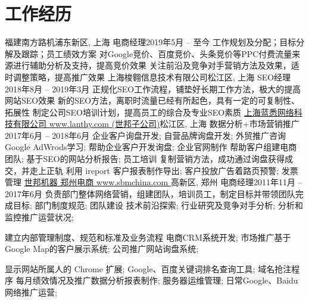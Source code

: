 \section{\textbf{工作经历}}
  \resumeSubHeadingListStart
    \resumeSubheading
      {福建南方路机}{浦东新区, 上海}
      {电商经理}{2019年5月 -- 至今}
      \resumeItemListStart
          {工作规划及分配；目标分解及跟踪；员工绩效方案}
          {对Google竞价、百度竞价、头条竞价等PPC付费流量来源进行辅助分析及支持，提高竞价效果}
          {关注前沿及竞争对手营销方法及效果，适时调整策略，提高推广效果}
      \resumeItemListEnd
    \resumeSubheading
      {上海梭翱信息技术有限公司}{松江区, 上海}
      {SEO经理}{2018年8月 -- 2019年3月}
      \resumeItemListStart
          {正规化SEO工作流程，铺垫好长期工作方法，极大的提高网站SEO效果}
          {新的SEO方法，离职时流量已经有所起色，具有一定的可复制性、拓展性}
          {制定公司SEO培训计划，提高员工的综合及专业SEO素质}
      \resumeItemListEnd
    \resumeSubheading
      {\href{http://www.lanthy.com/}{上海蓝悉网络科技有限公司 www.lanthy.com (世邦子公司)}}{松江区, 上海}
      {数据分析+市场营销推广}{2017年6月 -- 2018年6月}
      \resumeItemListStart
          {企业客户询盘开发; 自营品牌询盘开发; 外贸推广咨询}
          {Google AdWrods学习; 帮助企业客户开发询盘; 企业官网制作}
          {帮助客户组建电商团队; 基于SEO的网站分析报告; 员工培训}
          {复制营销方法，成功通过询盘获得成交，并走上正轨}
          {利用 ireport 客户报表制作导出; 客户投放广告着路页预警; 发票管理}
      \resumeItemListEnd
    \resumeSubheading
      {\href{http://www.sbmchina.com/}{世邦机器 郑州电商 www.sbmchina.com }}{高新区, 郑州}
      {电商经理}{2011年11月 -- 2017年6月}
      \resumeItemListStart
          {负责部门整体网络营销，组建团队，培训员工，制定目标并带领团队完成目标; 部门制度规范; 团队建设}
          {技术前沿探索; 行业研究及竞争对手分析; 分析和监控推广运营状况;}

          {建立内部管理制度、规范和标准及业务流程}
          {电商CRM系统开发; 市场推广基于Google Map的客户展示系统; 公司推广网站询盘系统; }

          {显示网站所属人的 Chrome 扩展; Google、百度关键词排名查询工具; 域名抢注程序 }
          {每月绩效情况及推广数据分析报表制作; 服务器运维管理; 日常Google、Baidu网络推广运营;}


